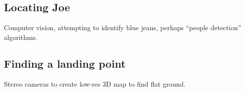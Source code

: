 \subsection{Locating Joe}
Computer vision, attempting to identify blue jeans, perhaps ``people detection'' algorithms.

\subsection{Finding a landing point}
Stereo cameras to create low-res 3D map to find flat ground.